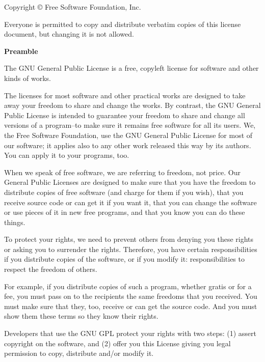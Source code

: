 

\blank
Copyright \copyright {} Free Software Foundation, Inc. 

Everyone is permitted to copy and distribute verbatim copies of this license document, but changing it is not allowed.

{\bf Preamble}

The GNU General Public License is a free, copyleft license for software and other kinds of works.

The licenses for most software and other practical works are designed to take away your freedom to share and change the works.  By contrast, the GNU General Public License is intended to guarantee your freedom to share and change all versions of a program--to make sure it remains free software for all its users.  We, the Free Software Foundation, use the GNU General Public License for most of our software; it applies also to any other work released this way by its authors.  You can apply it to your programs, too.

When we speak of free software, we are referring to freedom, not price.  Our General Public Licenses are designed to make sure that you have the freedom to distribute copies of free software (and charge for them if you wish), that you receive source code or can get it if you want it, that you can change the software or use pieces of it in new free programs, and that you know you can do these things.

To protect your rights, we need to prevent others from denying you these rights or asking you to surrender the rights.  Therefore, you have certain responsibilities if you distribute copies of the software, or if you modify it: responsibilities to respect the freedom of others.

For example, if you distribute copies of such a program, whether gratis or for a fee, you must pass on to the recipients the same freedoms that you received.  You must make sure that they, too, receive or can get the source code.  And you must show them these terms so they know their rights.

Developers that use the GNU GPL protect your rights with two steps: (1) assert copyright on the software, and (2) offer you this License giving you legal permission to copy, distribute and/or modify it.

